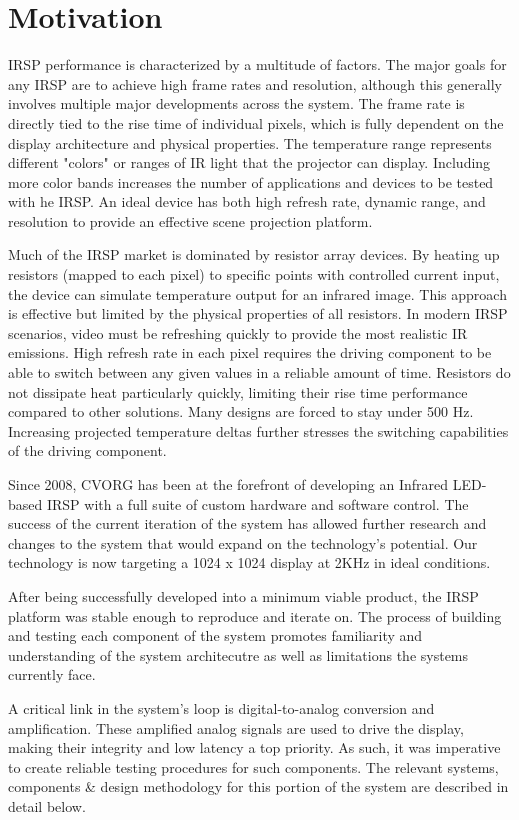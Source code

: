\section {Motivation}
IRSP performance is characterized by a multitude of factors. The major goals for any IRSP are to achieve high frame rates and resolution, although this generally involves multiple major developments across the system. The frame rate is directly tied to the rise time of individual pixels, which is fully dependent on the display architecture and physical properties. The temperature range represents different "colors" or ranges of IR light that the projector can display. Including more color bands increases the number of applications and devices to be tested with he IRSP. An ideal device has both high refresh rate, dynamic range, and resolution to provide an effective scene projection platform. \cite{marks} \par

Much of the IRSP market is dominated by resistor array devices. By heating up resistors (mapped to each pixel) to specific points with controlled current input, the device can simulate temperature output for an infrared image. This approach is effective but limited by the physical properties of all resistors. \cite{spie:2015} In modern IRSP scenarios, video must be refreshing quickly to provide the most realistic IR emissions.  High refresh rate in each pixel requires the driving component to be able to switch between any given values in a reliable amount of time. Resistors do not dissipate heat particularly quickly, limiting their rise time performance compared to other solutions. Many designs are forced to stay under 500 Hz. Increasing projected temperature deltas further stresses the switching capabilities of the driving component.\par

Since 2008, CVORG has been at the forefront of developing an Infrared LED-based IRSP with a full suite of custom hardware and software control. \cite{peyman} The success of the current iteration of the system has allowed further research and changes to the system that would expand on the technology's potential. Our technology is now targeting a 1024 x 1024 display at 2KHz in ideal conditions. \par

After being successfully developed into a minimum viable product, the IRSP platform was stable enough to reproduce and iterate on. The process of building and testing each component of the system promotes familiarity and understanding of the system architecutre as well as limitations the systems currently face. \par

A critical link in the system's loop is digital-to-analog conversion and amplification. These amplified analog signals are used to drive the display, making their integrity and low latency a top priority. \cite{tianne} As such, it was imperative to create reliable testing procedures for such components. The relevant systems, components \& design methodology for this portion of the system are described in detail below. \par
